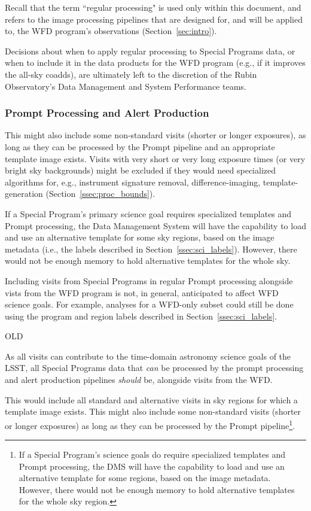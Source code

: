 Recall that the term ``regular processing" is used only within this document,
and refers to the image processing pipelines that are designed for, 
and will be applied to, the WFD program's observations (Section~\ref{sec:intro}).

Decisions about when to apply regular processing to Special Programs data,
or when to include it in the data products for the WFD program 
(e.g., if it improves the all-sky coadds), 
are ultimately left to the discretion of the Rubin Observatory's 
Data Management and System Performance teams.


\subsubsection{Prompt Processing and Alert Production}\label{sssec:proc_reg_prompt}

This might also include some non-standard visits (shorter or longer exposures), 
as long as they can be processed by the Prompt pipeline and an appropriate template image exists.
Visits with very short or very long exposure times (or very bright sky 
backgrounds) might be excluded if they would need specialized algorithms for,
e.g., instrument signature removal, difference-imaging, template-generation 
(Section~\ref{ssec:proc_bounds}).

If a Special Program's primary science goal requires specialized templates and 
Prompt processing, the Data Management System will have the capability to load 
and use an alternative template for some sky regions, based on the image metadata 
(i.e., the labels described in Section~\ref{ssec:sci_labels}). 
However, there would not be enough memory to hold alternative templates 
for the whole sky.

Including visits from Special Programs in regular Prompt processing alongside
vists from the WFD program is not, in general, anticipated to affect WFD science goals.
For example, analyses for a WFD-only subset could still be done using the program and
region labels described in Section~\ref{ssec:sci_labels}.


OLD


As all visits can contribute to the time-domain astronomy science goals 
of the LSST, all Special Programs data that {\it can} be processed by the 
prompt processing and alert production pipelines {\it should} be, 
alongside visits from the WFD.

This would include all standard and alternative visits in sky regions for which 
a template image exists.
This might also include some non-standard visits (shorter or longer exposures) 
as long as they can be processed by the Prompt 
pipeline\footnote{If a Special Program's science goals do require 
specialized templates and 
Prompt processing, the DMS will have the capability to load and use an 
alternative template for some regions, based on the image metadata. 
However, there would not be enough memory to hold alternative templates 
for the whole sky region.}.

